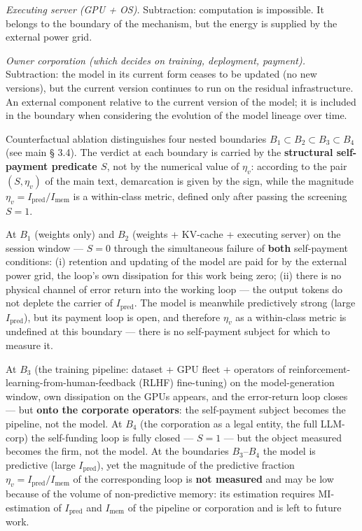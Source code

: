 \documentclass[pdflatex,sn-mathphys-ay]{sn-jnl}
\begin{document}
\emph{Executing server (GPU + OS).} Subtraction: computation is impossible. It belongs to the boundary of the mechanism, but the energy is supplied by the external power grid.

\emph{Owner corporation (which decides on training, deployment, payment).} Subtraction: the model in its current form ceases to be updated (no new versions), but the current version continues to run on the residual infrastructure. An external component relative to the current version of the model; it is included in the boundary when considering the evolution of the model lineage over time.

Counterfactual ablation distinguishes four nested boundaries \(B_1 \subset B_2 \subset B_3 \subset B_4\) (see main § 3.4). The verdict at each boundary is carried by the \textbf{structural self-payment predicate \(S\)}, not by the numerical value of \(\eta_v\): according to the pair \((S, \eta_v)\) of the main text, demarcation is given by the sign, while the magnitude \(\eta_v = I_{\text{pred}}/I_{\text{mem}}\) is a within-class metric, defined only after passing the screening \(S = 1\).

At \(B_1\) (weights only) and \(B_2\) (weights + KV-cache + executing server) on the session window --- \(S = 0\) through the simultaneous failure of \textbf{both} self-payment conditions: (i) retention and updating of the model are paid for by the external power grid, the loop's own dissipation for this work being zero; (ii) there is no physical channel of error return into the working loop --- the output tokens do not deplete the carrier of \(I_{\text{pred}}\). The model is meanwhile predictively strong (large \(I_{\text{pred}}\)), but its payment loop is open, and therefore \(\eta_v\) as a within-class metric is undefined at this boundary --- there is no self-payment subject for which to measure it.

At \(B_3\) (the training pipeline: dataset + GPU fleet + operators of reinforcement-learning-from-human-feedback (RLHF) fine-tuning) on the model-generation window, own dissipation on the GPUs appears, and the error-return loop closes --- but \textbf{onto the corporate operators}: the self-payment subject becomes the pipeline, not the model. At \(B_4\) (the corporation as a legal entity, the full LLM-corp) the self-funding loop is fully closed --- \(S = 1\) --- but the object measured becomes the firm, not the model. At the boundaries \(B_3\)--\(B_4\) the model is predictive (large \(I_{\text{pred}}\)), yet the magnitude of the predictive fraction \(\eta_v = I_{\text{pred}}/I_{\text{mem}}\) of the corresponding loop is \textbf{not measured} and may be low because of the volume of non-predictive memory: its estimation requires MI-estimation of \(I_{\text{pred}}\) and \(I_{\text{mem}}\) of the pipeline or corporation and is left to future work.
\end{document}
